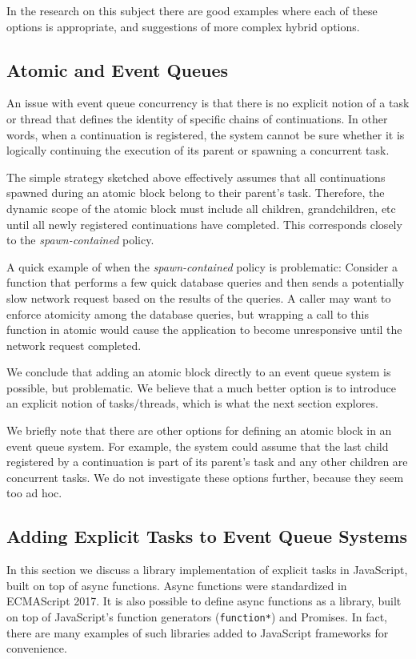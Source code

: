 \documentclass[sigplan,10pt,review,anonymous]{acmart}\settopmatter{printfolios=true,printccs=false,printacmref=false}
\begin{document}
In the research on this subject there are good examples where each of these options is appropriate, and suggestions of more complex hybrid options.

\subsection{Atomic and Event Queues}

An issue with event queue concurrency is that there is no explicit notion of a task or thread that defines the identity of specific chains of continuations.
In other words, when a continuation is registered, the system cannot be sure whether it is logically continuing the execution of its parent or spawning a concurrent task.

The simple strategy sketched above effectively assumes that all continuations spawned during an atomic block belong to their parent's task.
Therefore, the dynamic scope of the atomic block must include all children, grandchildren, etc until all newly registered continuations have completed.
This corresponds closely to the \emph{spawn-contained} policy.

A quick example of when the \emph{spawn-contained} policy is problematic:
Consider a function that performs a few quick database queries and then sends a potentially slow network request based on the results of the queries.
A caller may want to enforce atomicity among the database queries, but wrapping a call to this function in atomic would cause the application to become unresponsive until the network request completed.

We conclude that adding an atomic block directly to an event queue system is possible, but problematic.
We believe that a much better option is to introduce an explicit notion of tasks/threads, which is what the next section explores.

We briefly note that there are other options for defining an atomic block in an event queue system.
For example, the system could assume that the last child registered by a continuation is part of its parent's task and any other children are concurrent tasks.
We do not investigate these options further, because they seem too ad hoc.

\subsection{Adding Explicit Tasks to Event Queue Systems}

In this section we discuss a library implementation of explicit tasks in JavaScript, built on top of async functions.
Async functions were standardized in ECMAScript 2017.
It is also possible to define async functions as a library, built on top of JavaScript's function generators (\texttt{function*}) and Promises.
In fact, there are many examples of such libraries added to JavaScript frameworks for convenience.
\end{document}
